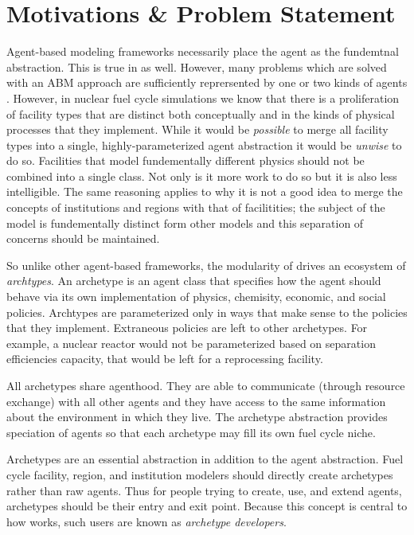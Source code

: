 \section{Motivations \& Problem Statement}

Agent-based modeling frameworks necessarily place the agent as the fundemtnal 
abstraction. This is true in \cyclus as well. However, many problems which are 
solved with an ABM approach are sufficiently reprersented by one or two kinds of 
agents \citeme. However, in nuclear fuel cycle simulations we know that there is
a proliferation of facility types that are distinct both conceptually and in the 
kinds of physical processes that they implement. While it would be \emph{possible}
to merge all facility types into a single, highly-parameterized agent abstraction
it would be \emph{unwise} to do so. Facilities that model fundementally different
physics should not be combined into a single class. Not only is it more work to 
do so but it is also less intelligible. The same reasoning applies to why it is 
not a good idea to merge the concepts of institutions and regions with that of
facilitities; the subject of the model is fundementally distinct form other models
and this separation of concerns should be maintained.

So unlike other agent-based frameworks, the modularity of \cyclus drives 
an ecosystem of \emph{archtypes}. An archetype is an agent class that specifies 
how the agent should behave via its own implementation of physics, chemisity, 
economic, and social policies. Archtypes are parameterized only in ways that 
make sense to the policies that they implement. Extraneous policies are left to 
other archetypes. For example, a nuclear reactor would not be parameterized based 
on separation efficiencies capacity, that would be left for a reprocessing facility.

All archetypes share agenthood. They are able to communicate (through resource 
exchange) with all other agents and they have access to the same information 
about the environment in which they live. The archetype abstraction provides
speciation of agents so that each archetype may fill its own fuel cycle niche.

Archetypes are an essential abstraction in addition to the agent abstraction. 
Fuel cycle facility, region, and institution modelers should directly create
archetypes rather than raw agents. Thus for people trying to create, use, and 
extend \cyclus agents, archetypes should be their entry and exit point. Because this 
concept is central to how \cyclus works, such users are known as \emph{archetype
developers}.

